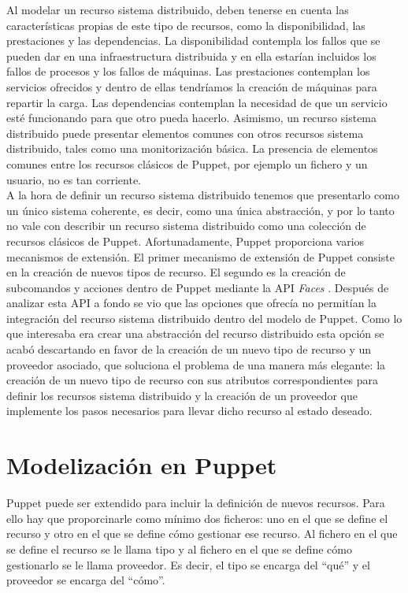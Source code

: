 Al modelar un recurso sistema distribuido, deben tenerse en cuenta las características propias de este tipo de recursos, como la disponibilidad, las prestaciones y las dependencias. La disponibilidad contempla los fallos que se pueden dar en una infraestructura distribuida y en ella estarían incluidos los fallos de procesos y los fallos de máquinas. Las prestaciones contemplan los servicios ofrecidos y dentro de ellas tendríamos la creación de máquinas para repartir la carga. Las dependencias contemplan la necesidad de que un servicio esté funcionando para que otro pueda hacerlo. Asimismo, un recurso sistema distribuido puede presentar elementos comunes con otros recursos sistema distribuido, tales como una monitorización básica. La presencia de elementos comunes entre los recursos clásicos de Puppet, por ejemplo un fichero y un usuario, no es tan corriente. \\

A la hora de definir un recurso sistema distribuido tenemos que presentarlo como un único sistema coherente, es decir, como una única abstracción, y por lo tanto no vale con describir un recurso sistema distribuido como una colección de recursos clásicos de Puppet. Afortunadamente, Puppet proporciona varios mecanismos de extensión. El primer mecanismo de extensión de Puppet consiste en la creación de nuevos tipos de recurso. El segundo es la creación de subcomandos y acciones dentro de Puppet mediante la API \emph{Faces} \cite{puppet-faces}. Después de analizar esta API a fondo se vio que las opciones que ofrecía no permitían la integración del recurso sistema distribuido dentro del modelo de Puppet. Como lo que interesaba era crear una abstracción del recurso distribuido esta opción se acabó descartando en favor de la creación de un nuevo tipo de recurso y un proveedor asociado, que soluciona el problema de una manera más elegante: la creación de un nuevo tipo de recurso con sus atributos correspondientes para definir los recursos sistema distribuido y la creación de un proveedor que implemente los pasos necesarios para llevar dicho recurso al estado deseado.


\section{Modelización en Puppet}
\label{sec:modelado-puppet}

Puppet puede ser extendido para incluir la definición de nuevos recursos. Para ello hay que proporcinarle como mínimo dos ficheros: uno en el que se define el recurso y otro en el que se define cómo gestionar ese recurso. Al fichero en el que se define el recurso se le llama tipo y al fichero en el que se define cómo gestionarlo se le llama proveedor. Es decir, el tipo se encarga del ``qué'' y el proveedor se encarga del ``cómo''.\\

